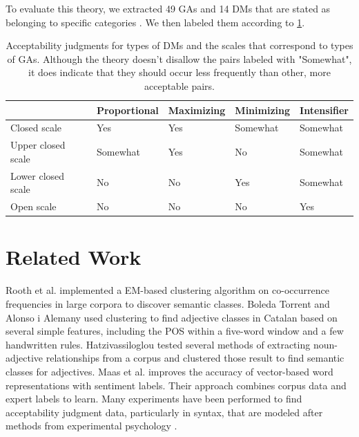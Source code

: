 \documentclass[11pt]{article}
\begin{document}
To evaluate this theory, we extracted 49 GAs and 14 DMs that are stated as belonging to specific categories \cite{kennedymcnally} \cite{kennedy07}. We then labeled them according to \ref{tab:theory-table}.

\begin{center}
\begin{table}[ht]
\hfill{}
\begin{tabular}{|l|l|l|l|l|}
\hline & \bf Proportional & \bf Maximizing & \bf Minimizing & \bf Intensifier \\ \hline
Closed scale & Yes & Yes & Somewhat & Somewhat \\ \hline
Upper closed scale & Somewhat & Yes & No & Somewhat \\ \hline
Lower closed scale & No & No & Yes & Somewhat \\ \hline
Open scale & No & No & No & Yes \\ \hline
\end{tabular}
\hfill{}
\caption{\label{tab:theory-table} Acceptability judgments for types of DMs and the scales that correspond to types of GAs. Although the theory doesn't disallow the pairs labeled with "Somewhat", it does indicate that they should occur less frequently than other, more acceptable pairs.}
\end{table}
\end{center}

\section{Related Work}

Rooth et al.  implemented a EM-based clustering algorithm on co-occurrence frequencies in large corpora to discover semantic classes. Boleda Torrent and Alonso i Alemany  used clustering to find adjective classes in Catalan based on several simple features, including the POS within a five-word window and a few handwritten rules. Hatzivassiloglou  tested several methods of extracting noun-adjective relationships from a corpus and clustered those result to find semantic classes for adjectives. Maas et al.  improves the accuracy of vector-based word representations with sentiment labels. Their approach combines corpus data and expert labels to learn. Many experiments have been performed to find acceptability judgment data, particularly in syntax, that are modeled after methods from experimental psychology \cite{sprouse}.
\end{document}
